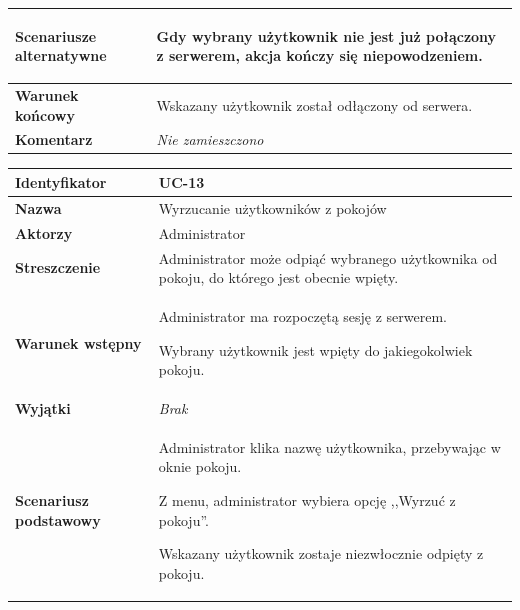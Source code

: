 {\begin{tabular}{ | l | l | }
	\hline
		\textbf{Scenariusze alternatywne} & \parbox[t]
		{11cm}{
			\begin{enumreq}
				\item Gdy wybrany użytkownik nie jest już połączony z serwerem, akcja
				kończy się niepowodzeniem.
			\end{enumreq}
		}
		\\

	\hline
		\textbf{Warunek końcowy} & \parbox[t]{11cm}{
			Wskazany użytkownik został odłączony od serwera.
		}
		\\

	\hline
		\textbf{Komentarz} & \parbox[t]{11cm}{
			\textit{Nie zamieszczono}
		}
		\\

	\hline
\end{tabular}

\vspace{2em}

\begin{tabular}{ | l | l | }
	\hline
		\textbf{Identyfikator} &
		UC-13
		\\

	\hline
		\textbf{Nazwa} &
		Wyrzucanie użytkowników z pokojów
		\\

	\hline
		\textbf{Aktorzy} & \parbox[t]{11cm}{
			Administrator
		}\\

	\hline
		\textbf{Streszczenie} & \parbox[t]{11cm}{
			Administrator może odpiąć wybranego użytkownika od pokoju, do którego jest
			obecnie wpięty.
		}\\

	\hline
		\textbf{Warunek wstępny} & \parbox[t]{11cm}{
			\begin{enumreq}
				\item Administrator ma rozpoczętą sesję z serwerem.
				\item Wybrany użytkownik jest wpięty do jakiegokolwiek pokoju.
			\end{enumreq}
		}
		\\

	\hline
		\textbf{Wyjątki} & \parbox[t]{11cm}{
			\textit{Brak}

		}
		\\

	\hline
		\textbf{Scenariusz podstawowy} & \parbox[t]{11cm}{
			\begin{enumreq}
				\item Administrator klika nazwę użytkownika, przebywając w oknie pokoju.
				\item Z menu, administrator wybiera opcję ,,Wyrzuć z pokoju''.
				\item Wskazany użytkownik zostaje niezwłocznie odpięty z pokoju.
			\end{enumreq}
		}
		\\


\end{tabular}}
